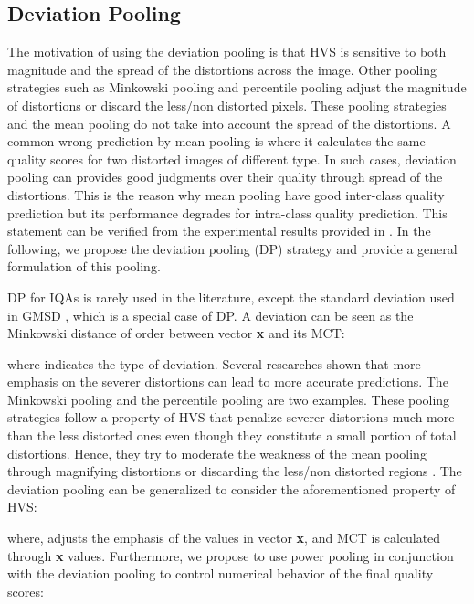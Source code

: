 \subsection{Deviation Pooling}


The motivation of using the deviation pooling is that HVS is sensitive to both magnitude and the spread of the distortions across the image. Other pooling strategies such as Minkowski pooling and percentile pooling adjust the magnitude of distortions or discard the less/non distorted pixels. These pooling strategies and the mean pooling do not take into account the spread of the distortions. A common wrong prediction by mean pooling is where it calculates the same quality scores for two distorted images of different type. In such cases, deviation pooling can provides good judgments over their quality through spread of the distortions. This is the reason why mean pooling have good inter-class quality prediction but its performance degrades for intra-class quality prediction. This statement can be verified from the experimental results provided in \cite{GMSD}. In the following, we propose the deviation pooling (DP) strategy and provide a general formulation of this pooling. 

DP for IQAs is rarely used in the literature, except the standard deviation used in GMSD \cite{GMSD}, which is a special case of DP. A deviation can be seen as the Minkowski distance of order  between vector \textbf{x} and its MCT:  
                    
where  indicates the type of deviation. Several researches shown that more emphasis on the severer distortions can lead to more accurate predictions. The Minkowski pooling \cite{spatial2006} and the percentile pooling \cite{percentile2009} are two examples. These pooling strategies follow a property of HVS that penalize severer distortions much more than the less distorted ones even though they constitute a small portion of total distortions. Hence, they try to moderate the weakness of the mean pooling through magnifying distortions \cite{spatial2006} or discarding the less/non distorted regions \cite{percentile2009}. The deviation pooling can be generalized to consider the aforementioned property of HVS:
                    
where,  adjusts the emphasis of the values in vector \textbf{x}, and MCT is calculated through \textbf{x} values. Furthermore, we propose to use power pooling in conjunction with the deviation pooling to control numerical behavior of the final quality scores:
                    
